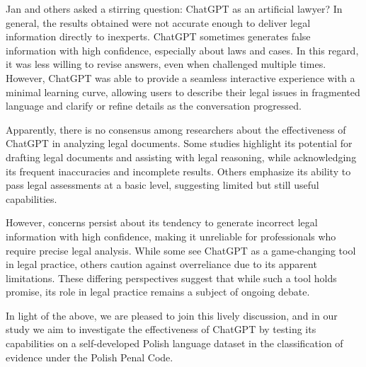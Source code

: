 Jan and others \cite{tan2023chatgpt} asked a stirring question: ChatGPT as an artificial lawyer? In general, the results obtained were not accurate enough to deliver legal information directly to inexperts. ChatGPT sometimes generates false information with high confidence, especially about laws and cases. In this regard, it was less willing to revise answers, even when challenged multiple times. However, ChatGPT was able to provide a seamless interactive experience with a minimal learning curve, allowing users to describe their legal issues in fragmented language and clarify or refine details as the conversation progressed. 

Apparently, there is no consensus among researchers about the effectiveness of ChatGPT in analyzing legal documents. Some studies highlight its potential for drafting legal documents and assisting with legal reasoning, while acknowledging its frequent inaccuracies and incomplete results. Others emphasize its ability to pass legal assessments at a basic level, suggesting limited but still useful capabilities. 

However, concerns persist about its tendency to generate incorrect legal information with high confidence, making it unreliable for professionals who require precise legal analysis. While some see ChatGPT as a game-changing tool in legal practice, others caution against overreliance due to its apparent limitations. These differing perspectives suggest that while such a tool holds promise, its role in legal practice remains a subject of ongoing debate.

In light of the above, we are pleased to join this lively discussion, and in our study we aim to investigate the effectiveness of ChatGPT by testing its capabilities on a self-developed Polish language dataset in the classification of evidence under the Polish Penal Code.
